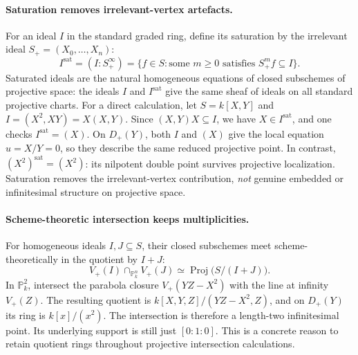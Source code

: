 \paragraph{Saturation removes irrelevant-vertex artefacts.}
For an ideal \(I\) in the standard graded ring, define its
saturation by the irrelevant ideal \(S_+=(X_0,\ldots,X_n)\):
\[
 I^{\mathrm{sat}}=(I:S_+^\infty)
   =\{f\in S:\text{some }m\ge0\text{ satisfies }S_+^mf\subseteq I\}.
\]
Saturated ideals are the natural homogeneous equations of closed
subschemes of projective space: the ideals \(I\) and
\(I^{\mathrm{sat}}\) give the same sheaf of ideals on all standard
projective charts.  For a direct calculation, let
\(S=k[X,Y]\) and \(I=(X^2,XY)=X(X,Y)\).
Since \((X,Y)X\subseteq I\), we have
\(X\in I^{\mathrm{sat}}\), and one checks
\(I^{\mathrm{sat}}=(X)\).
On \(D_+(Y)\), both \(I\) and \((X)\) give the local equation
\(u=X/Y=0\), so they describe the same reduced projective point.
In contrast, \((X^2)^{\mathrm{sat}}=(X^2)\): its nilpotent double
point survives projective localization.  Saturation removes the
irrelevant-vertex contribution, \emph{not} genuine embedded or
infinitesimal structure on projective space.

\paragraph{Scheme-theoretic intersection keeps multiplicities.}
For homogeneous ideals \(I,J\subseteq S\), their closed
subschemes meet scheme-theoretically in the quotient by \(I+J\):
\[
 V_+(I)\cap_{\mathbb P^n_k}V_+(J)
       \simeq\operatorname{Proj}\bigl(S/(I+J)\bigr).
\]
In \(\mathbb P_k^2\), intersect the parabola closure
\(V_+(YZ-X^2)\) with the line at infinity \(V_+(Z)\).
The resulting quotient is \(k[X,Y,Z]/(YZ-X^2,Z)\), and on
\(D_+(Y)\) its ring is \(k[x]/(x^2)\).
The intersection is therefore a length-two infinitesimal point.
Its underlying support is still just \([0:1:0]\).  This is a
concrete reason to retain quotient rings throughout projective
intersection calculations.
